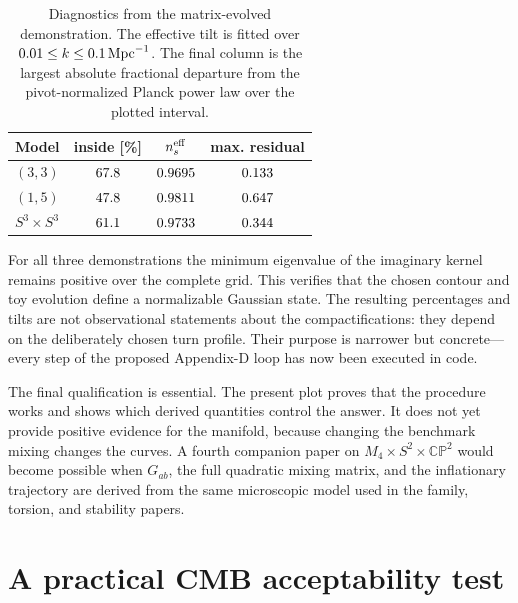\documentclass[aps,prd,twocolumn,superscriptaddress,nofootinbib,longbibliography,floatfix]{revtex4-2}
\newcommand{\CP}{\mathbb{CP}}
\begin{document}
\begin{table}[tbp]
\caption{Diagnostics from the matrix-evolved demonstration.  The effective tilt is fitted over $0.01\leq k\leq0.1\,{\rm Mpc}^{-1}$.  The final column is the largest absolute fractional departure from the pivot-normalized Planck power law over the plotted interval.}
\label{tab:matrixdiagnostics}
\begin{ruledtabular}
\begin{tabular}{lccc}
Model & inside [\%] & $n_s^{\rm eff}$ & max. residual\\
\hline
$(3,3)$ & $67.8$ & $0.9695$ & $0.133$\\
$(1,5)$ & $47.8$ & $0.9811$ & $0.647$\\
$S^3\times S^3$ & $61.1$ & $0.9733$ & $0.344$\\
\end{tabular}
\end{ruledtabular}
\end{table}

For all three demonstrations the minimum eigenvalue of the imaginary kernel remains positive over the complete grid.  This verifies that the chosen contour and toy evolution define a normalizable Gaussian state.  The resulting percentages and tilts are not observational statements about the compactifications: they depend on the deliberately chosen turn profile.  Their purpose is narrower but concrete---every step of the proposed Appendix-D loop has now been executed in code.

The final qualification is essential. The present plot proves that the procedure works and shows which derived quantities control the answer. It does not yet provide positive evidence for the manifold, because changing the benchmark mixing changes the curves. A fourth companion paper on $M_4\times S^2\times\CP^2$ would become possible when $G_{ab}$, the full quadratic mixing matrix, and the inflationary trajectory are derived from the same microscopic model used in the family, torsion, and stability papers.

\section{A practical CMB acceptability test}
\label{sec:acceptance}
\end{document}
